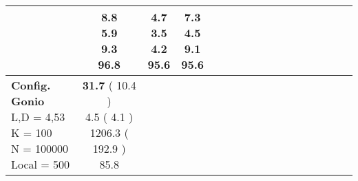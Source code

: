 \documentclass[9pt]{article}
\begin{document}
\begin{landscape}
\begin{longtable}{ l | c c c c | c c c c | c c c c | c c c c |}
             &
                            \makecell{              8.8
     \\
            {\footnotesize             5.9
    } \\  {\footnotesize             9.3
     } \\
            {\small \textcolor[rgb]{ 0.264 , 0.636 , 0.1} {96.8  }
} }
             &                         \makecell{              \textbf{ 4.7 }
     \\
            {\footnotesize             \textbf{ 3.5 }
    } \\  {\footnotesize             4.2
     } \\
            {\small \textcolor[rgb]{ 0.288 , 0.612 , 0.1} {95.6  }
} }
             &
                            \makecell{              \textbf{ 7.3 }
     \\
            {\footnotesize             \textbf{ 4.5 }
    } \\  {\footnotesize             9.1
     } \\
            {\small \textcolor[rgb]{ 0.288 , 0.612 , 0.1} {95.6  }
} }
            

 \\
                                                            
                    \hline
                    \makecell{ \textbf{ Config. Gonio} \\
                    { \small L,D = 4,53} \\
                    {\small K = 100} \\
                    {\small N = 100000 } \\ {\small Local = 500 }} &
                    
                            \makecell{              \textbf{ 31.7 }
     (             10.4
    ) \\
            {\footnotesize             4.5
     (              4.1
     )} \\
            {\footnotesize             1206.3
     (            192.9
    ) } \\
            {\small  \textcolor[rgb]{ 0.484 , 0.416 , 0.1} {85.8  }
} }



\end{longtable}
\end{landscape}
\end{document}
